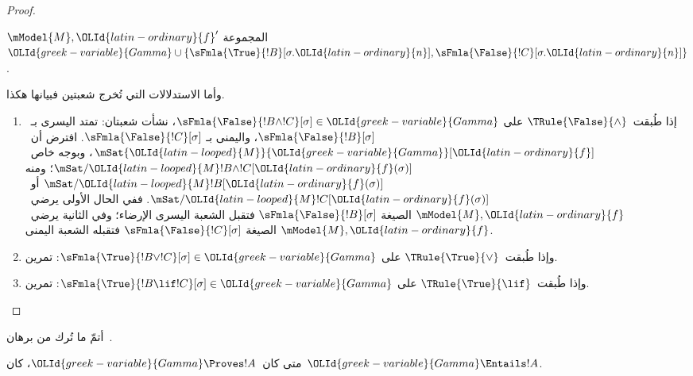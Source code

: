 \documentclass[../../../include/open-logic-section]{subfiles}
\begin{document}
\begin{proof}
\begin{enumerate}
  $\mModel{M}, {\OLId{latin-ordinary}{f}}'$ المجموعة
  ${\OLId{greek-variable}{Gamma}} \cup \{\sFmla{\True}{!B}[\sigma.{\OLId{latin-ordinary}{n}}],
  \sFmla{\False}{!C}[\sigma.{\OLId{latin-ordinary}{n}}]\}$.
\end{enumerate}
وأما الاستدلالات التي تُخرج شعبتين فبيانها هكذا.
\begin{enumerate}
\item إذا طُبقت~$\TRule{\False}{\land}$ على
  $\sFmla{\False}{!B \land !C}[\sigma] \in {\OLId{greek-variable}{Gamma}}$، نشأت شعبتان:
  تمتد اليسرى بـ~$\sFmla{\False}{!B}[\sigma]$، واليمنى بـ
  $\sFmla{\False}{!C}[\sigma]$. افترض أن~$\mSat{{\OLId{latin-looped}{M}}}{{\OLId{greek-variable}{Gamma}}}[{\OLId{latin-ordinary}{f}}]$،
  وبوجه خاص~$\mSat/{{\OLId{latin-looped}{M}}}{!B \land !C}[{\OLId{latin-ordinary}{f}}(\sigma)]$؛ ومنه
  $\mSat/{{\OLId{latin-looped}{M}}}{!B}[{\OLId{latin-ordinary}{f}}(\sigma)]$ أو~$\mSat/{{\OLId{latin-looped}{M}}}{!C}[{\OLId{latin-ordinary}{f}}(\sigma)]$.
  ففي الحال الأولى يرضي~$\mModel{M}, {\OLId{latin-ordinary}{f}}$ الصيغة
  $\sFmla{\False}{!B}[\sigma]$ فتقبل الشعبة اليسرى الإرضاء؛ وفي
  الثانية يرضي~$\mModel{M}, {\OLId{latin-ordinary}{f}}$ الصيغة
  $\sFmla{\False}{!C}[\sigma]$ فتقبله الشعبة اليمنى.
\item وإذا طُبقت~$\TRule{\True}{\lor}$ على
    $\sFmla{\True}{!B \lor !C}[\sigma] \in {\OLId{greek-variable}{Gamma}}$: تمرين.
\item وإذا طُبقت~$\TRule{\True}{\lif}$ على
    $\sFmla{\True}{!B \lif !C}[\sigma] \in {\OLId{greek-variable}{Gamma}}$: تمرين.
\end{enumerate}
\end{proof}

\begin{prob}
أتمّ ما تُرك من برهان~.
\end{prob}

\begin{cor}
متى كان~${\OLId{greek-variable}{Gamma}} \Proves !A$، كان~${\OLId{greek-variable}{Gamma}} \Entails !A$.
\end{cor}
\end{document}
